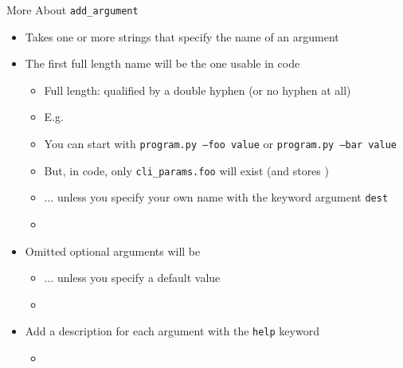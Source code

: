 \begin{frame}[fragile]{More About \texttt{add\_argument}}
%
\begin{itemize}
\item Takes one or more strings that specify the name of an argument
\item The first full length name will be the one usable in code
	\begin{itemize}
	\item Full length: qualified by a double hyphen (or no hyphen at all)
	\item E.\;g. 
	\item[\Thus] You can start with \texttt{program.py --foo value} or \texttt{program.py --bar value}
	\item[\Thus] But, in code, only \texttt{cli\_params.foo} will exist (and stores )
	\item ... unless you specify your own name with the keyword argument \texttt{dest}
	\item[\Thus] 
	\end{itemize}
\item Omitted optional arguments will be 
	\begin{itemize}
	\item ... unless you specify a default value
	\item[\Thus] 
	\end{itemize}
\item Add a description for each argument with the \texttt{help} keyword
	\begin{itemize}
	\item [\Thus] 
	\end{itemize}
\end{itemize}
%
\end{frame}


